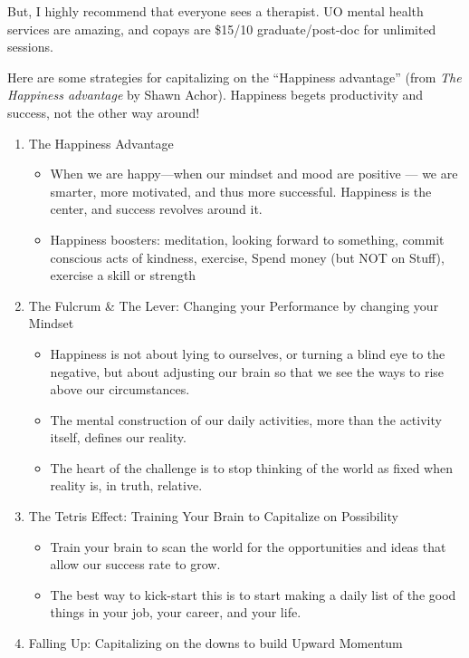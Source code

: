 \documentclass[12pt]{article}
\begin{document}
But, I highly recommend that everyone sees a therapist. UO mental
health services are amazing, and copays are \$15/10 graduate/post-doc
for unlimited sessions.

Here are some strategies for capitalizing on the ``Happiness
advantage'' (from \textit{The Happiness advantage} by Shawn
Achor). Happiness begets productivity and success, not the other way
around!

\begin{enumerate}
\item The Happiness Advantage
  \begin{itemize}
\item When we are happy—when our mindset and mood are positive --- we
  are smarter, more motivated, and thus more successful. Happiness is
  the center, and success revolves around it.
\item Happiness boosters: meditation, looking forward to something,
  commit conscious acts of kindness, exercise, Spend money (but NOT on
  Stuff), exercise a skill or strength
  \end{itemize}
\item The Fulcrum \& The Lever: Changing your Performance by changing
  your Mindset
  \begin{itemize}
\item Happiness is not about lying to ourselves, or turning a blind
  eye to the negative, but about adjusting our brain so that we see
  the ways to rise above our circumstances.
 \item The mental construction of our daily activities, more than the
   activity itself, defines our reality.
\item The heart of the challenge is to stop thinking of the world as fixed
when reality is, in truth, relative.
  \end{itemize}
\item The Tetris Effect: Training Your Brain to Capitalize on Possibility
\begin{itemize}
\item Train your brain to scan the world for the opportunities and
  ideas that allow our success rate to grow.
\item The best way to kick-start this is to start making a daily list
  of the good things in your job, your career, and your life.
 \end{itemize}
\item Falling Up: Capitalizing on the downs to build Upward Momentum
\begin{itemize}

\end{itemize}
\end{enumerate}
\end{document}
